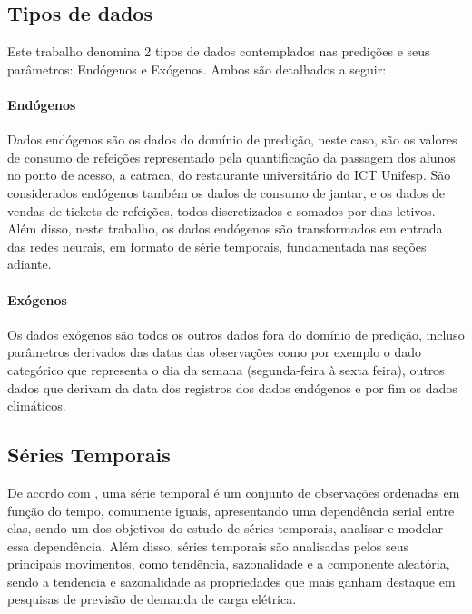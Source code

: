 \subsection{Tipos de dados}
  
Este trabalho denomina 2 tipos de dados contemplados nas predições e seus parâmetros: 
Endógenos e Exógenos. Ambos são detalhados a seguir:
            
\paragraph{Endógenos}
Dados endógenos são os dados do domínio de predição, neste caso, são os valores de consumo de refeições representado pela quantificação da passagem dos alunos no ponto de acesso, a catraca, do restaurante universitário do ICT Unifesp.
São considerados endógenos também os dados de consumo de jantar, e os dados de vendas de tickets de refeições, todos discretizados e somados por dias letivos. Além disso, neste trabalho, os dados endógenos são transformados em entrada das redes neurais, em formato de série temporais, fundamentada nas seções adiante.
            
\paragraph{Exógenos}
Os dados exógenos são todos os outros dados fora do domínio de predição, incluso parâmetros derivados das datas das observações como por exemplo o dado categórico que representa o dia da semana (segunda-feira à sexta feira), outros dados que derivam da data dos registros dos dados endógenos e por fim os dados climáticos.
          
          
\subsection{Séries Temporais}


De acordo com  \cite{Morettin1987}, uma série temporal é um conjunto de observações ordenadas em função do tempo, comumente iguais, apresentando uma dependência serial entre elas, sendo um dos objetivos do estudo de séries temporais, analisar e modelar essa dependência. Além disso, séries temporais são analisadas pelos seus principais movimentos, como tendência, sazonalidade e a componente aleatória, sendo a tendencia e sazonalidade as propriedades que mais ganham destaque em pesquisas de previsão de demanda de carga elétrica.

